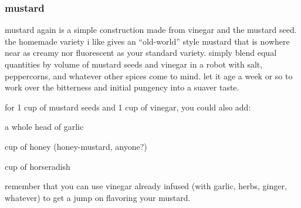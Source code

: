 \subsubsection{mustard}

mustard again is a simple construction made from vinegar and the mustard seed. 
the homemade variety i like gives an ``old-world'' style mustard that is 
nowhere near as creamy nor fluorescent as your standard variety. simply blend 
equal quantities by volume of mustard seeds and vinegar in a robot with salt, 
peppercorns, and whatever other spices come to mind. let it age a week or so 
to work over the bitterness and initial pungency into a suaver taste.

for 1 cup of mustard seeds and 1 cup of vinegar, you could also add:

\begin{ingredients}
  \item a whole head of garlic
  \item \threequarters cup of honey (honey-mustard, anyone?)
  \item \onequarter cup of horseradish
\end{ingredients}

remember that you can use vinegar already infused (with garlic, herbs, ginger, 
whatever) to get a jump on flavoring your mustard.
